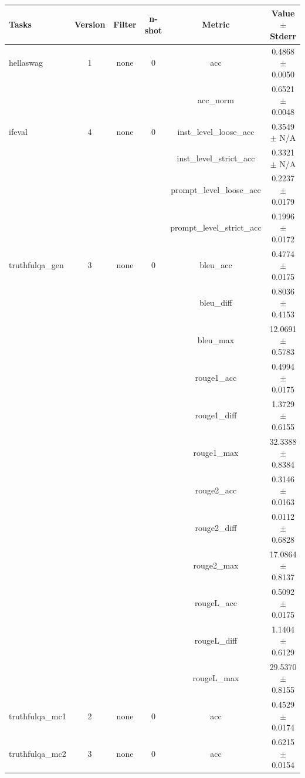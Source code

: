 \documentclass{ifacconf}
\begin{document}
\begin{strip}
\begin{minipage}{\textwidth}
			\begin{table}[H]
				\centering
				\begin{tabular}{|l|c|c|c|c|c|}
					\hline
					\textbf{Tasks} & \textbf{Version} & \textbf{Filter} & \textbf{n-shot} & \textbf{Metric} & \textbf{Value} $\pm$ \textbf{Stderr} \\ \hline
					hellaswag & 1 & none & 0 & acc & 0.4868 $\pm$ 0.0050 \\ \hline
					& & & & acc\_norm & 0.6521 $\pm$ 0.0048 \\ \hline
					ifeval & 4 & none & 0 & inst\_level\_loose\_acc & 0.3549 $\pm$ N/A \\ \hline
					& & & & inst\_level\_strict\_acc & 0.3321 $\pm$ N/A \\ \hline
					& & & & prompt\_level\_loose\_acc & 0.2237 $\pm$ 0.0179 \\ \hline
					& & & & prompt\_level\_strict\_acc & 0.1996 $\pm$ 0.0172 \\ \hline
					truthfulqa\_gen & 3 & none & 0 & bleu\_acc & 0.4774 $\pm$ 0.0175 \\ \hline
					& & & & bleu\_diff & 0.8036 $\pm$ 0.4153 \\ \hline
					& & & & bleu\_max & 12.0691 $\pm$ 0.5783 \\ \hline
					& & & & rouge1\_acc & 0.4994 $\pm$ 0.0175 \\ \hline
					& & & & rouge1\_diff & 1.3729 $\pm$ 0.6155 \\ \hline
					& & & & rouge1\_max & 32.3388 $\pm$ 0.8384 \\ \hline
					& & & & rouge2\_acc & 0.3146 $\pm$ 0.0163 \\ \hline
					& & & & rouge2\_diff & 0.0112 $\pm$ 0.6828 \\ \hline
					& & & & rouge2\_max & 17.0864 $\pm$ 0.8137 \\ \hline
					& & & & rougeL\_acc & 0.5092 $\pm$ 0.0175 \\ \hline
					& & & & rougeL\_diff & 1.1404 $\pm$ 0.6129 \\ \hline
					& & & & rougeL\_max & 29.5370 $\pm$ 0.8155 \\ \hline
					truthfulqa\_mc1 & 2 & none & 0 & acc & 0.4529 $\pm$ 0.0174 \\ \hline
					truthfulqa\_mc2 & 3 & none & 0 & acc & 0.6215 $\pm$ 0.0154 \\ \hline
				\end{tabular}
				\label{tab:gemma2_q6k}
			\end{table}
			

\end{minipage}
\end{strip}
\end{document}
